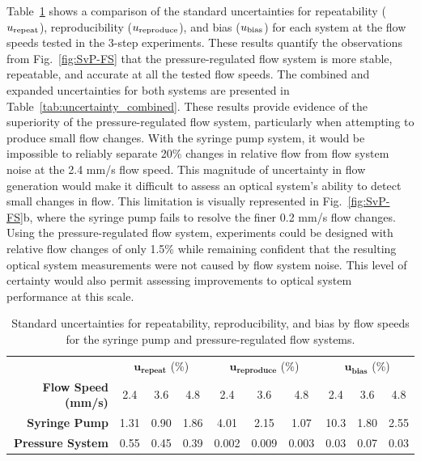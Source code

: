 \documentclass[12pt]{spieman}
\begin{document}
\begin{spacing}{2}
Table~\ref{tab:uncertainty_standard} shows a comparison of the standard uncertainties for repeatability ($u_\textnormal{repeat}$), reproducibility ($u_\textnormal{reproduce}$), and bias ($u_\textnormal{bias}$) for each system at the flow speeds tested in the 3-step experiments. These results quantify the observations from Fig.~\ref{fig:SvP-FS} that the pressure-regulated flow system is more stable, repeatable, and accurate at all the tested flow speeds. The combined and expanded uncertainties for both systems are presented in Table~\ref{tab:uncertainty_combined}. These results provide evidence of the superiority of the pressure-regulated flow system, particularly when attempting to produce small flow changes. With the syringe pump system, it would be impossible to reliably separate 20\% changes in relative flow from flow system noise at the 2.4 mm/s flow speed. This magnitude of uncertainty in flow generation would make it difficult to assess an optical system's ability to detect small changes in flow. This limitation is visually represented in Fig.~\ref{fig:SvP-FS}b, where the syringe pump fails to resolve the finer 0.2 mm/s flow changes. Using the pressure-regulated flow system, experiments could be designed with relative flow changes of only 1.5\% while remaining confident that the resulting optical system measurements were not caused by flow system noise. This level of certainty would also permit assessing improvements to optical system performance at this scale.

\begin{table}
    \caption {
        Standard uncertainties for repeatability, reproducibility, and bias by flow speeds for the syringe pump and pressure-regulated flow systems.
    }
    \label{tab:uncertainty_standard}
    \centering
    \begin{tabular}{rccccccccc}
        \addlinespace
        \toprule
            &
            \multicolumn{3}{c}{$\boldsymbol{u_\textbf{repeat}}$ (\%)}       & 
            \multicolumn{3}{c}{$\boldsymbol{u_\textbf{reproduce}}$ (\%)}    & 
            \multicolumn{3}{c}{$\boldsymbol{u_\textbf{bias}}$ (\%)}         \\
            \cmidrule(lr){2-4}
            \cmidrule(lr){5-7}
            \cmidrule(lr){8-10}
        \textbf{Flow Speed (mm/s)} & 2.4    & 3.6   & 4.8   & 2.4   & 3.6   & 4.8   & 2.4   & 3.6   & 4.8   \\
        \midrule
        \textbf{Syringe Pump}      & 1.31   & 0.90  & 1.86  & 4.01  & 2.15  & 1.07  & 10.3  & 1.80  & 2.55  \\
        \textbf{Pressure System}   & 0.55   & 0.45  & 0.39  & 0.002 & 0.009 & 0.003 & 0.03  & 0.07  & 0.03  \\
        \bottomrule
    \end{tabular}
\end{table}


\end{spacing}
\end{document}
